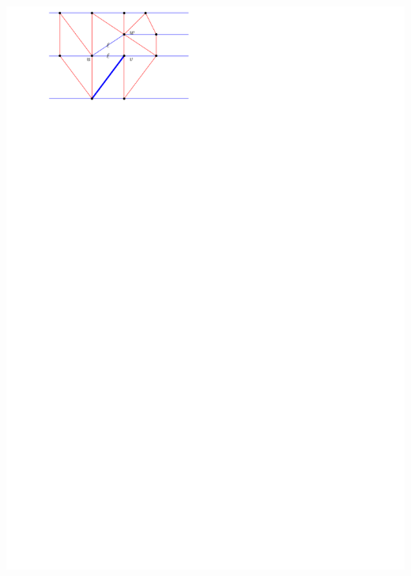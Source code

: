 \documentclass[a4paper]{article}
\begin{document}
\includegraphics[scale=1]{./blueFaceSubdivision/img/puttingTroughLoad.pdf}
\clearpage%
\end{document}

